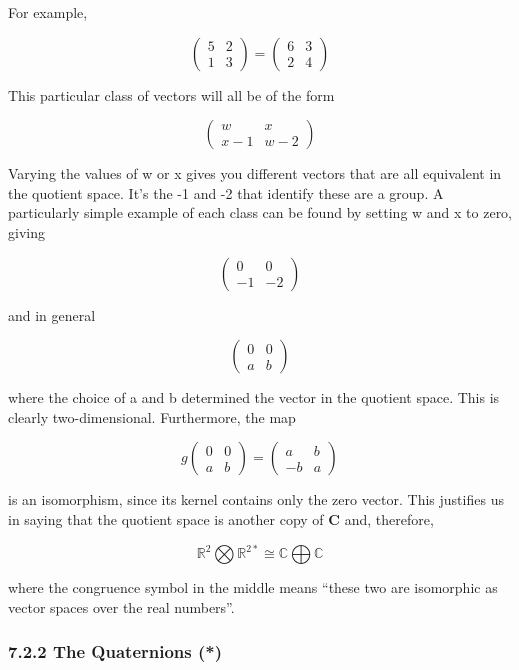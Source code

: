 \documentclass[oneside,english]{amsbook}
\numberwithin{section}{chapter}
\theoremstyle{plain}
\theoremstyle{definition}
\begin{document}
For example,

\[\begin{pmatrix}
	5 & 2 \\
	1 & 3
\end{pmatrix} = \begin{pmatrix}
	6 & 3 \\
	2 & 4
\end{pmatrix}\]

This particular class of vectors will all be of the form

\[\begin{pmatrix}
	w & x \\
	x - 1 & w - 2
\end{pmatrix}\]

Varying the values of w or x gives you different vectors that are all
equivalent in the quotient space. It's the -1 and -2 that identify these
are a group. A particularly simple example of each class can be found by
setting w and x to zero, giving

\[\begin{pmatrix}
	0 & 0 \\
	- 1 & - 2
\end{pmatrix}\]

and in general

\[\begin{pmatrix}
	0 & 0 \\
	a & b
\end{pmatrix}\]

where the choice of a and b determined the vector in the quotient space.
This is clearly two-dimensional. Furthermore, the map

\[g\begin{pmatrix}
	0 & 0 \\
	a & b
\end{pmatrix} = \begin{pmatrix}
	a & b \\
	- b & a
\end{pmatrix}\]

is an isomorphism, since its kernel contains only the zero vector. This
justifies us in saying that the quotient space is another copy of
\textbf{C} and, therefore,

\[\mathbb{R}^{2}\bigotimes\mathbb{R}^{2*}\mathbb{\cong C\bigoplus C}\]

where the congruence symbol in the middle means ``these two are
isomorphic as vector spaces over the real numbers''.

\subsubsection{7.2.2 The Quaternions (*)}\label{the-quaternions}
\end{document}
